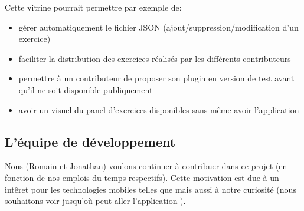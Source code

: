 Cette vitrine pourrait permettre par exemple de:
\begin{itemize}
    \item gérer automatiquement le fichier JSON (ajout/suppression/modification d'un exercice)
    \item faciliter la distribution des exercices réalisés par les différents contributeurs
    \item permettre à un contributeur de proposer son plugin en version de test avant qu'il ne soit disponible publiquement
    \item avoir un visuel du panel d'exercices disponibles sans même avoir l'application
\end{itemize}


\subsection{L'équipe de développement}
Nous (Romain et Jonathan) voulons continuer à contribuer dans ce projet (en fonction de nos emplois du temps respectifs). Cette motivation est due à un int\^{e}ret pour les technologies mobiles telles que \android{} mais aussi à notre curiosité (nous souhaitons voir jusqu'où peut aller l'application \pepitMobil{}).
